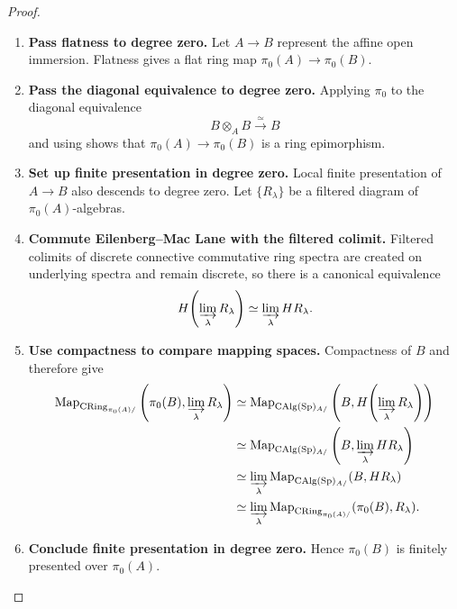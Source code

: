 \begin{proof}
\leavevmode
\begin{enumerate}[label=\textup{(\arabic*)}]
    \item \textbf{Pass flatness to degree zero.}
    Let \(A\to B\) represent the affine open immersion. Flatness gives a
    flat ring map \(\pi_0(A)\to\pi_0(B)\).

    \item \textbf{Pass the diagonal equivalence to degree zero.}
    Applying \(\pi_0\) to the
    diagonal equivalence
    \[
        B\otimes_AB\xrightarrow{\simeq}B
    \]
    and using  shows that
    \(\pi_0(A)\to\pi_0(B)\) is a ring epimorphism.

    \item \textbf{Set up finite presentation in degree zero.}
    Local finite presentation of \(A\to B\) also descends to degree zero.
    Let \(\{R_\lambda\}\) be a filtered diagram of
    \(\pi_0(A)\)-algebras.

    \item \textbf{Commute Eilenberg--Mac Lane with the filtered colimit.}
    Filtered colimits of discrete connective
    commutative ring spectra are created on underlying spectra and remain
    discrete, so there is a canonical equivalence
    \[
        H\!\left(\varinjlim_\lambda R_\lambda\right)
        \simeq
        \varinjlim_\lambda HR_\lambda.
    \]

    \item \textbf{Use compactness to compare mapping spaces.}
    Compactness of \(B\) and  therefore give
    \[
    \begin{aligned}
        \operatorname{Map}_{\operatorname{CRing}_{\pi_0(A)/}}
        \left(\pi_0(B),\varinjlim_\lambda R_\lambda\right)
        &\simeq
        \operatorname{Map}_{\operatorname{CAlg}(\operatorname{Sp})_{A/}}
        \left(B,H\!\left(\varinjlim_\lambda R_\lambda\right)\right)
        \\
        &\simeq
        \operatorname{Map}_{\operatorname{CAlg}(\operatorname{Sp})_{A/}}
        \left(B,\varinjlim_\lambda HR_\lambda\right)
        \\
        &\simeq
        \varinjlim_\lambda
        \operatorname{Map}_{\operatorname{CAlg}(\operatorname{Sp})_{A/}}(B,HR_\lambda)
        \\
        &\simeq
        \varinjlim_\lambda
        \operatorname{Map}_{\operatorname{CRing}_{\pi_0(A)/}}
        (\pi_0(B),R_\lambda).
    \end{aligned}
    \]

    \item \textbf{Conclude finite presentation in degree zero.}
    Hence \(\pi_0(B)\) is finitely presented over \(\pi_0(A)\).


\end{enumerate}
\end{proof}
